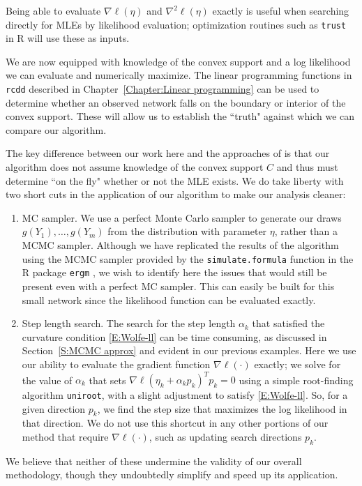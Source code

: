 Being able to evaluate $\nabla \ell(\eta)$ and 
$\nabla^2 \ell(\eta)$ exactly is useful when searching directly for MLEs
by likelihood evaluation;
optimization routines such as \texttt{trust} \citep{trust:R} in R will use these
as inputs.  

We are now equipped with knowledge of the convex support and a log likelihood we 
can evaluate and numerically maximize.  The linear programming functions in 
\texttt{rcdd} described in Chapter~\ref{Chapter:Linear programming} 
can be used to determine whether an observed network falls on the boundary 
or interior of the convex support.  These will allow us to establish the ``truth" 
against which we can compare our algorithm.

The key difference between our work here and the approaches of 
\citep{Handcock:degeneracy,Rinaldo:2009} is that our algorithm does not assume
knowledge of the convex support $C$ and thus must determine ``on the fly" whether
or not the MLE exists.  
We do take liberty with two short cuts in the application of our algorithm to make 
our analysis cleaner:
\begin{enumerate}
\item MC sampler.  We use a perfect Monte Carlo sampler to generate our draws \\
$g(Y_1), \ldots, g(Y_m)$ from the distribution with parameter $\eta$, rather than a 
MCMC sampler.
Although we have replicated the results of the algorithm using the MCMC sampler 
 provided by the \texttt{simulate.formula}  function in the R package \texttt{ergm} 
 \citep{ergm:R}, we wish to identify here the 
issues that would still be present even with a perfect MC sampler.  This can 
easily be built for this small network since the likelihood function can be 
evaluated exactly.  


\item Step length search.  The search for the step length $\alpha_k$ that satisfied the 
curvature condition \eqref{E:Wolfe-ll} can be time consuming, as discussed in
Section~\ref{S:MCMC approx} and evident in our previous examples.
Here we use our ability to evaluate the gradient function $\nabla \ell(\cdot)$ exactly;  
we solve for the value of $\alpha_k$ that sets $\nabla \ell( \eta_k + \alpha_k p_k)^T p_k = 0$ 
using a simple root-finding algorithm \texttt{uniroot}, with a slight 
adjustment to satisfy \eqref{E:Wolfe-ll}.  So, for a given 
direction $p_k$, we find the step size that maximizes the log likelihood in that 
direction.
We do not use this shortcut in any other portions of our method that 
require $\nabla \ell(\cdot)$, 
such as updating search directions $p_k$.

\end{enumerate}
We believe that neither of these undermine the validity of our overall methodology, 
though they undoubtedly simplify and speed up its application.


